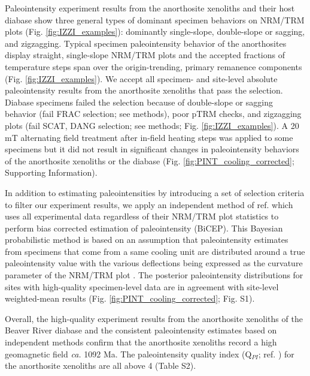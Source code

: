 \documentclass[9pt,twocolumn,twoside,lineno]{pnas-new}
\begin{document}
Paleointensity experiment results from the anorthosite xenoliths and their host diabase show three general types of dominant specimen behaviors on NRM/TRM plots (Fig. \ref{fig:IZZI_examples}): dominantly single-slope, double-slope or sagging, and zigzagging. Typical specimen paleointensity behavior of the anorthosites display straight, single-slope NRM/TRM plots and the accepted fractions of temperature steps span over the origin-trending, primary remanence components (Fig. \ref{fig:IZZI_examples}). We accept all specimen- and site-level absolute paleointensity results from the anorthosite xenoliths that pass the selection. Diabase specimens failed the selection because of double-slope or sagging behavior (fail FRAC selection; see methods), poor pTRM checks, and zigzagging plots (fail SCAT, DANG selection; see methods; Fig. \ref{fig:IZZI_examples}). A 20 mT alternating field treatment after in-field heating steps was applied to some specimens but it did not result in significant changes in paleointensity behaviors of the anorthosite xenoliths or the diabase (Fig. \ref{fig:PINT_cooling_corrected}; Supporting Information). 

In addition to estimating paleointensities by introducing a set of selection criteria to filter our experiment results, we apply an independent method of ref. \citealp{Cych2021a} which uses all experimental data regardless of their NRM/TRM plot statistics to perform bias corrected estimation of paleointensity (BiCEP). This Bayesian probabilistic method is based on an assumption that paleointensity estimates from specimens that come from a same cooling unit are distributed around a true paleointensity value with the various deflections being expressed as the curvature parameter of the NRM/TRM plot \cite{Paterson2011a}. The posterior paleointensity distributions for sites with high-quality specimen-level data are in agreement with site-level weighted-mean results (Fig. \ref{fig:PINT_cooling_corrected}; Fig. S1).

Overall, the high-quality experiment results from the anorthosite xenoliths of the Beaver River diabase and the consistent paleointensity estimates based on independent methods confirm that the anorthosite xenoliths record a high geomagnetic field \textit{ca.} 1092 Ma. The paleointensity quality index (Q$_{PI}$; ref. \citealp{Biggin2014a}) for the anorthosite xenoliths are all above 4 (Table S2). 
\end{document}
